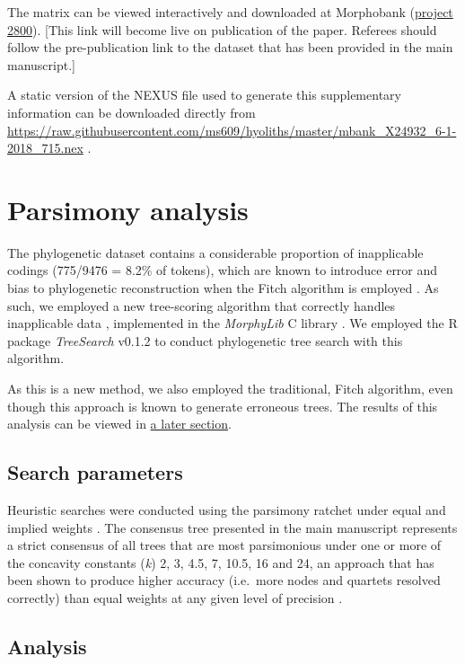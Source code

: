 \documentclass[openany]{book}
\theoremstyle{definition}
\theoremstyle{definition}
\theoremstyle{definition}
\theoremstyle{remark}
\begin{document}
The matrix can be viewed interactively and downloaded at Morphobank
(\href{https://morphobank.org/permalink/?P2800}{project 2800}). {[}This
link will become live on publication of the paper. Referees should
follow the pre-publication link to the dataset that has been provided in
the main manuscript.{]}

A static version of the NEXUS file used to generate this supplementary
information can be downloaded directly from
\url{https://raw.githubusercontent.com/ms609/hyoliths/master/mbank_X24932_6-1-2018_715.nex}
.

\hypertarget{treesearch}{\chapter{Parsimony analysis}\label{treesearch}}

The phylogenetic dataset contains a considerable proportion of
inapplicable codings (775/9476 = 8.2\% of tokens), which are known to
introduce error and bias to phylogenetic reconstruction when the Fitch
algorithm is employed \citep{Maddison1993, Brazeau2018}. As such, we
employed a new tree-scoring algorithm that correctly handles
inapplicable data \citep{Brazeau2018}, implemented in the
\emph{MorphyLib} C library \citep{Brazeau2017Morphylib}. We employed the
R package \emph{TreeSearch} v0.1.2 \citep{Smith2018TreeSearch} to
conduct phylogenetic tree search with this algorithm.

As this is a new method, we also employed the traditional, Fitch
algorithm, even though this approach is known to generate erroneous
trees. The results of this analysis can be viewed in
\protect\hyperlink{fitch}{a later section}.

\section{Search parameters}\label{search-parameters}

Heuristic searches were conducted using the parsimony ratchet
\citep{Nixon1999} under equal and implied weights \citep{Goloboff1997}.
The consensus tree presented in the main manuscript represents a strict
consensus of all trees that are most parsimonious under one or more of
the concavity constants (\emph{k}) 2, 3, 4.5, 7, 10.5, 16 and 24, an
approach that has been shown to produce higher accuracy (i.e.~more nodes
and quartets resolved correctly) than equal weights at any given level
of precision \citep{Smith2017}.

\section{Analysis}\label{analysis}
\end{document}
